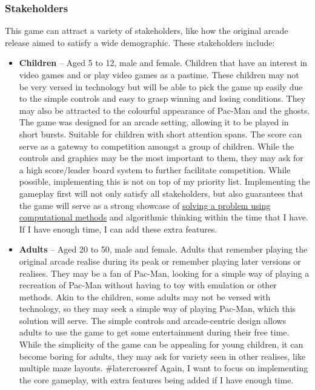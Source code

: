 \documentclass[letterpaper, 11pt]{article}
\begin{document}
\subsubsection{Stakeholders}
\label{sec:org03c04f2}
This game can attract a variety of stakeholders, like how the original arcade release aimed to satisfy a wide demographic.
These stakeholders include:

\begin{itemize}
\item \textbf{Children} – Aged 5 to 12, male and female.
Children that have an interest in video games and or play video games as a pastime.
These children may not be very versed in technology but will be able to pick the game up easily due to the simple controls and easy to grasp winning and losing conditions.
They may also be attracted to the colourful appearance of Pac-Man and the ghosts.
The game was designed for an arcade setting, allowing it to be played in short bursts.
Suitable for children with short attention spans.
The score can serve as a gateway to competition amongst a group of children.
While the controls and graphics may be the most important to them, they may ask for a high score/leader board system to further facilitate competition.
While possible, implementing this is not on top of my priority list.
Implementing the gameplay first will not only satisfy all stakeholders, but also guarantees that the game will serve as a strong showcase of \hyperref[Solving the Problem using Computational Methods]{solving a problem using computational methods} and algorithmic thinking within the time that I have.
If I have enough time, I can add these extra features.

\item \textbf{Adults} – Aged 20 to 50, male and female.
 Adults that remember playing the original arcade realise during its peak or remember playing later versions or realises.
 They may be a fan of Pac-Man, looking for a simple way of playing a recreation of Pac-Man without having to toy with emulation or other methods.
 Akin to the children, some adults may not be versed with technology, so they may seek a simple way of playing Pac-Man, which this solution will serve.
 The simple controls and arcade-centric design allows adults to use the game to get some entertainment during their free time.
 While the simplicity of the game can be appealing for young children, it can become boring for adults, they may ask for variety seen in other realises, like multiple maze layouts.
  \#latercrossref
Again, I want to focus on implementing the core gameplay, with extra features being added if I have enough time.


\end{itemize}
\end{document}
